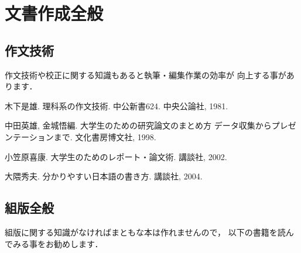 \section{文書作成全般}

\subsection{作文技術}

作文技術や校正に関する知識もあると執筆・編集作業の効率が
向上する事があります．

\begin{myreferences}
 木下是雄.
\newblock 理科系の作文技術.
\newblock 中公新書624. 中央公論社, 1981.

 中田英雄, 金城悟編.
\newblock 大学生のための研究論文のまとめ方\zdash
  データ収集からプレゼンテーションまで.
\newblock 文化書房博文社, 1998.

 小笠原喜康.
\newblock 大学生のためのレポート・論文術.
\newblock 講談社, 2002.

 大隈秀夫.
\newblock 分かりやすい日本語の書き方.
\newblock 講談社, 2004.
\end{myreferences}


\subsection{組版全般}

組版に関する知識がなければまともな本は作れませんので，
以下の書籍を読んでみる事をお勧めします．

